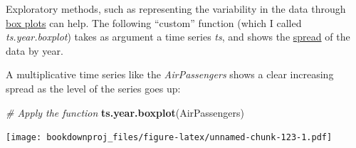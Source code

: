 \documentclass[
]{article}
\newenvironment{Shaded}{\begin{snugshade}}{\end{snugshade}}
\newcommand{\CommentTok}[1]{\textcolor[rgb]{0.56,0.35,0.01}{\textit{#1}}}
\newcommand{\ControlFlowTok}[1]{\textcolor[rgb]{0.13,0.29,0.53}{\textbf{#1}}}
\newcommand{\DataTypeTok}[1]{\textcolor[rgb]{0.13,0.29,0.53}{#1}}
\newcommand{\DecValTok}[1]{\textcolor[rgb]{0.00,0.00,0.81}{#1}}
\newcommand{\KeywordTok}[1]{\textcolor[rgb]{0.13,0.29,0.53}{\textbf{#1}}}
\newcommand{\NormalTok}[1]{#1}
\newcommand{\OperatorTok}[1]{\textcolor[rgb]{0.81,0.36,0.00}{\textbf{#1}}}
\newcommand{\StringTok}[1]{\textcolor[rgb]{0.31,0.60,0.02}{#1}}
\begin{document}
Exploratory methods, such as representing the variability in the data through \href{https://en.wikipedia.org/wiki/Box_plot}{box plots} can help. The following ``custom'' function (which I called \emph{ts.year.boxplot}) takes as argument a time series \emph{ts}, and shows the \href{https://en.wikipedia.org/wiki/Statistical_dispersion}{spread} of the data by year.

\begin{Shaded}
\end{Shaded}

A multiplicative time series like the \emph{AirPassengers} shows a clear increasing spread as the level of the series goes up:

\begin{Shaded}
\begin{Highlighting}[]
\CommentTok{# Apply the function}
\KeywordTok{ts.year.boxplot}\NormalTok{(AirPassengers)}
\end{Highlighting}
\end{Shaded}

\texttt{[image: bookdownproj\_files/figure-latex/unnamed-chunk-123-1.pdf]}
\end{document}
